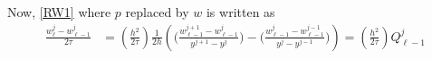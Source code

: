 \documentclass[a4paper,11pt]{article}
\def\l{{h}}
\theoremstyle{remark}
\begin{document}
Now, \eqref{RW1} where $p$ replaced by $w$ is written as
\begin{equation} \label{RW1w}
\begin{aligned}
 \frac{w^j_\ell - w^j_{\ell-1}}{2\tau} &= \left(\frac{h^2}{2\tau}\right) \frac{1}{2h}\left( \Big(\tfrac{w^{j+1}_{\ell-1} - w^{j}_{\ell-1}}{y^{j+1}-y^j}\Big) -\Big(\tfrac{w^{j}_{\ell-1} - w^{j-1}_{\ell-1}}{y^{j}-y^{j-1}} \Big)\right)= \left(\frac{h^2}{2\tau}\right)Q^j_{\ell-1}
  \end{aligned}
\end{equation}
% 
\end{document}
